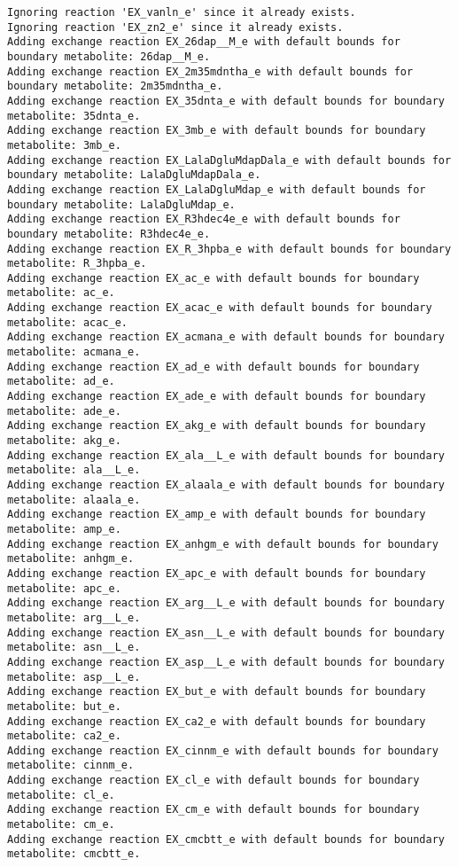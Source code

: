 \documentclass[
  letterpaper,
  DIV=11,
  numbers=noendperiod]{scrartcl}
\begin{document}
\begin{verbatim}
Ignoring reaction 'EX_vanln_e' since it already exists.
Ignoring reaction 'EX_zn2_e' since it already exists.
Adding exchange reaction EX_26dap__M_e with default bounds for boundary metabolite: 26dap__M_e.
Adding exchange reaction EX_2m35mdntha_e with default bounds for boundary metabolite: 2m35mdntha_e.
Adding exchange reaction EX_35dnta_e with default bounds for boundary metabolite: 35dnta_e.
Adding exchange reaction EX_3mb_e with default bounds for boundary metabolite: 3mb_e.
Adding exchange reaction EX_LalaDgluMdapDala_e with default bounds for boundary metabolite: LalaDgluMdapDala_e.
Adding exchange reaction EX_LalaDgluMdap_e with default bounds for boundary metabolite: LalaDgluMdap_e.
Adding exchange reaction EX_R3hdec4e_e with default bounds for boundary metabolite: R3hdec4e_e.
Adding exchange reaction EX_R_3hpba_e with default bounds for boundary metabolite: R_3hpba_e.
Adding exchange reaction EX_ac_e with default bounds for boundary metabolite: ac_e.
Adding exchange reaction EX_acac_e with default bounds for boundary metabolite: acac_e.
Adding exchange reaction EX_acmana_e with default bounds for boundary metabolite: acmana_e.
Adding exchange reaction EX_ad_e with default bounds for boundary metabolite: ad_e.
Adding exchange reaction EX_ade_e with default bounds for boundary metabolite: ade_e.
Adding exchange reaction EX_akg_e with default bounds for boundary metabolite: akg_e.
Adding exchange reaction EX_ala__L_e with default bounds for boundary metabolite: ala__L_e.
Adding exchange reaction EX_alaala_e with default bounds for boundary metabolite: alaala_e.
Adding exchange reaction EX_amp_e with default bounds for boundary metabolite: amp_e.
Adding exchange reaction EX_anhgm_e with default bounds for boundary metabolite: anhgm_e.
Adding exchange reaction EX_apc_e with default bounds for boundary metabolite: apc_e.
Adding exchange reaction EX_arg__L_e with default bounds for boundary metabolite: arg__L_e.
Adding exchange reaction EX_asn__L_e with default bounds for boundary metabolite: asn__L_e.
Adding exchange reaction EX_asp__L_e with default bounds for boundary metabolite: asp__L_e.
Adding exchange reaction EX_but_e with default bounds for boundary metabolite: but_e.
Adding exchange reaction EX_ca2_e with default bounds for boundary metabolite: ca2_e.
Adding exchange reaction EX_cinnm_e with default bounds for boundary metabolite: cinnm_e.
Adding exchange reaction EX_cl_e with default bounds for boundary metabolite: cl_e.
Adding exchange reaction EX_cm_e with default bounds for boundary metabolite: cm_e.
Adding exchange reaction EX_cmcbtt_e with default bounds for boundary metabolite: cmcbtt_e.

\end{verbatim}
\end{document}
